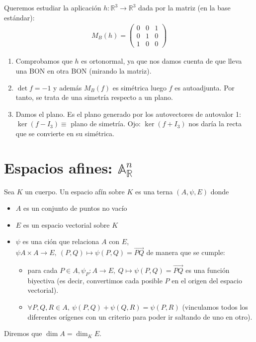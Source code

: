 \documentclass[14pt]{book}
\begin{document}
\begin{ej}
	Queremos estudiar la aplicación $h: \mathbb{R}^3 \to \mathbb{R}^3$ dada por la matriz (en la base estándar):
	\begin{align*}
		M_B(h) = \left(\begin{array}{ccc}
		0 & 0 & 1 \\ 0 & 1 & 0 \\ 1 & 0 & 0
		\end{array}\right)
	\end{align*}
	\begin{enumerate}
		\item Comprobamos que $h$ es ortonormal, ya que nos damos cuenta de que lleva una BON en otra BON (mirando la matriz).
		\item $\det f = -1$ y además $M_B(f)$ es simétrica luego $f$ es autoadjunta. Por tanto, se trata de una simetría respecto a un plano.
		\item Damos el plano. Es el plano generado por los autovectores de autovalor 1: $\ker ( f - I_3) \equiv$ plano de simetría. Ojo: $\ker(f  + I_3)$ nos daría la recta que se convierte en su simétrica.
	\end{enumerate}
\end{ej}


\chapter{Espacios afines: $\mathbb{A}^n_{\mathbb{R}}$}
\begin{dfn}
	Sea $K$ un cuerpo. Un espacio afín sobre $K$ es una terna $(A, \psi, E)$ donde
	\begin{itemize}
		\item $A$ es un conjunto de puntos no vacío
		\item $E$ es un espacio vectorial sobre $K$
		\item $\psi$ es una ción que relaciona $A$ con $E$, $\psi A \times A \to E,\ (P, Q) \mapsto \psi(P, Q) = \overrightarrow{PQ}$ de manera que se cumple:
		\begin{itemize}
			\item para cada $P \in A, \psi_P : A \to E,\ Q \mapsto \psi(P, Q) = \overrightarrow{PQ}$ es una función biyectiva (es decir, convertimos cada posible $P$ en el origen del espacio vectorial).
			\item $\forall P, Q, R \in A,\ \psi(P,Q) + \psi(Q, R) = \psi(P, R)$ (vinculamos todos los diferentes orígenes con un criterio para poder ir saltando de uno en otro).
		\end{itemize}
	\end{itemize}
	Diremos que $\dim A = \dim_K E$.
\end{dfn}
\end{document}
